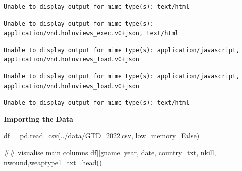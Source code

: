 \documentclass[
  letterpaper,
  DIV=11,
  numbers=noendperiod]{scrreprt}
\newenvironment{Shaded}{\begin{snugshade}}{\end{snugshade}}
\newcommand{\CommentTok}[1]{\textcolor[rgb]{0.37,0.37,0.37}{#1}}
\newcommand{\NormalTok}[1]{\textcolor[rgb]{0.00,0.23,0.31}{#1}}
\newcommand{\OperatorTok}[1]{\textcolor[rgb]{0.37,0.37,0.37}{#1}}
\newcommand{\StringTok}[1]{\textcolor[rgb]{0.13,0.47,0.30}{#1}}
\newcommand{\VariableTok}[1]{\textcolor[rgb]{0.07,0.07,0.07}{#1}}
\begin{document}
\begin{verbatim}
Unable to display output for mime type(s): text/html
\end{verbatim}

\begin{verbatim}
Unable to display output for mime type(s): application/vnd.holoviews_exec.v0+json, text/html
\end{verbatim}

\begin{verbatim}
Unable to display output for mime type(s): application/javascript, application/vnd.holoviews_load.v0+json
\end{verbatim}

\begin{verbatim}
Unable to display output for mime type(s): application/javascript, application/vnd.holoviews_load.v0+json
\end{verbatim}

\begin{verbatim}
Unable to display output for mime type(s): text/html
\end{verbatim}

\textbf{Importing the Data}

\begin{Shaded}
\begin{Highlighting}[]
\NormalTok{df }\OperatorTok{=}\NormalTok{ pd.read\_csv(}\StringTok{\textquotesingle{}../data/GTD\_2022.csv\textquotesingle{}}\NormalTok{, low\_memory}\OperatorTok{=}\VariableTok{False}\NormalTok{)}
\end{Highlighting}
\end{Shaded}

\begin{Shaded}
\begin{Highlighting}[]
\CommentTok{\#\# visualise main columns}
\NormalTok{df[[}\StringTok{\textquotesingle{}gname\textquotesingle{}}\NormalTok{, }\StringTok{\textquotesingle{}year\textquotesingle{}}\NormalTok{, }\StringTok{\textquotesingle{}date\textquotesingle{}}\NormalTok{, }\StringTok{\textquotesingle{}country\_txt\textquotesingle{}}\NormalTok{, }\StringTok{\textquotesingle{}nkill\textquotesingle{}}\NormalTok{, }\StringTok{\textquotesingle{}nwound\textquotesingle{}}\NormalTok{,}\StringTok{\textquotesingle{}weaptype1\_txt\textquotesingle{}}\NormalTok{]].head()}
\end{Highlighting}
\end{Shaded}
\end{document}

